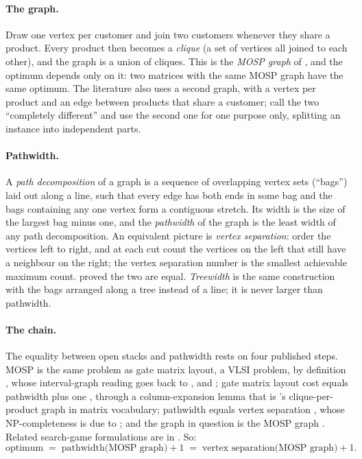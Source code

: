 \documentclass[11pt,a4paper]{article}
\begin{document}
\paragraph{The graph.}
Draw one vertex per customer and join two customers whenever they share a
product. Every product then becomes a \emph{clique} (a set of vertices all
joined to each other), and the graph is a union of cliques. This is the
\emph{MOSP graph} of \citet{Yanasse1997a}, and the optimum depends only on
it: two matrices with the same MOSP graph have the same optimum. The
literature also uses a second graph, with a vertex per product and an edge
between products that share a customer; \citet{YanasseSenne2010} call the two
``completely different'' and use the second one for one purpose only,
splitting an instance into independent parts.

\paragraph{Pathwidth.}
A \emph{path decomposition} of a graph is a sequence of overlapping vertex
sets (``bags'') laid out along a line, such that every edge has both ends in
some bag and the bags containing any one vertex form a contiguous stretch.
Its width is the size of the largest bag minus one, and the \emph{pathwidth}
of the graph is the least width of any path decomposition. An equivalent
picture is \emph{vertex separation}: order the vertices left to right, and at
each cut count the vertices on the left that still have a neighbour on the
right; the vertex separation number is the smallest achievable maximum count.
\citet{Kinnersley1992} proved the two are equal. \emph{Treewidth} is the same
construction with the bags arranged along a tree instead of a line; it is
never larger than pathwidth.

\paragraph{The chain.}
The equality between open stacks and pathwidth rests on four published steps.
MOSP is the same problem as gate matrix layout, a VLSI problem, by definition
\citep{LY2002}, whose interval-graph reading goes back to \citet{Ohtsuki1979},
\citet{Wing1985} and \citet{Mohring1990}; gate matrix layout cost equals
pathwidth plus one \citep{FL1989}, through a column-expansion lemma
\citep{FL1987} that is \citeauthor{Yanasse1997a}'s clique-per-product graph in
matrix vocabulary; pathwidth equals vertex separation \citep{Kinnersley1992},
whose NP-completeness is due to \citet{Lengauer1981}; and the graph in
question is the MOSP graph \citep{Yanasse1997a}. Related search-game
formulations are in \citet{KirousisPapadimitriou1986}. So:
\[
\text{optimum} \;=\; \text{pathwidth(MOSP graph)} + 1
\;=\; \text{vertex separation(MOSP graph)} + 1 .
\]
\end{document}
